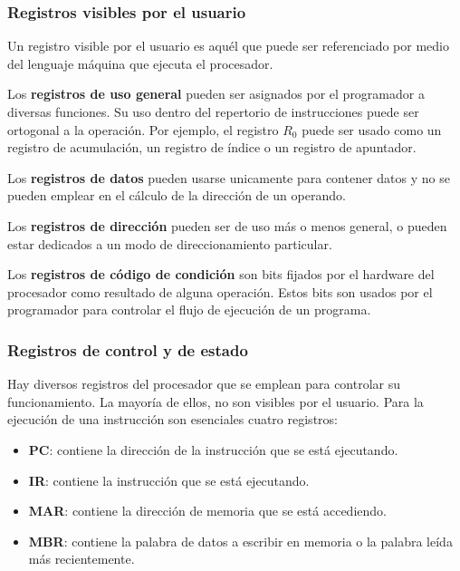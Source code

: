 \begin{subs}
  \subsubsection{Registros visibles por el usuario}
  Un registro visible por el usuario es aquél que puede ser referenciado por medio del lenguaje máquina que ejecuta el procesador.

  Los \textbf{registros de uso general} pueden ser asignados por el programador a diversas funciones. Su uso dentro del repertorio de instrucciones puede ser ortogonal a la operación. Por ejemplo, el registro $R_0$ puede ser usado como un registro de acumulación, un registro de índice o un registro de apuntador.

  Los \textbf{registros de datos} pueden usarse unicamente para contener datos y no se pueden emplear en el cálculo de la dirección de un operando.

  Los \textbf{registros de dirección} pueden ser de uso más o menos general, o pueden estar dedicados a un modo de direccionamiento particular.

  Los \textbf{registros de código de condición} son bits fijados por el hardware del procesador como resultado de alguna operación. Estos bits son usados por el programador para controlar el flujo de ejecución de un programa.

  \subsubsection{Registros de control y de estado}

  Hay diversos registros del procesador que se emplean para controlar su funcionamiento. La mayoría de ellos, no son visibles por el usuario. 
  Para la ejecución de una instrucción son esenciales cuatro registros:

  \begin{itemize}
    \item \textbf{PC}: contiene la dirección de la instrucción que se está ejecutando.
    \item \textbf{IR}: contiene la instrucción que se está ejecutando.
    \item \textbf{MAR}: contiene la dirección de memoria que se está accediendo.
    \item \textbf{MBR}: contiene la palabra de datos a escribir en memoria o la palabra leída más recientemente.
  \end{itemize}
\end{subs}

